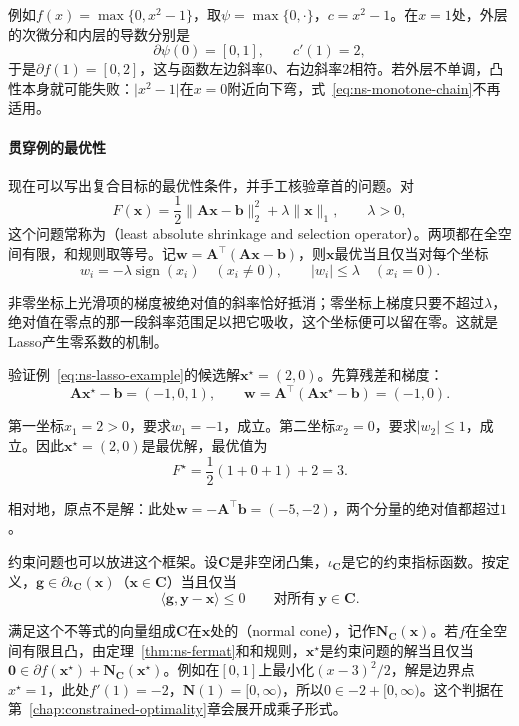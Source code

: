 例如$f(x)=\max\{0,x^2-1\}$，取$\psi=\max\{0,\cdot\}$，$c=x^2-1$。在$x=1$处，外层的次微分和内层的导数分别是
\[
 \partial\psi(0)=[0,1],\qquad c'(1)=2,
\]
于是$\partial f(1)=[0,2]$，这与函数左边斜率$0$、右边斜率$2$相符。若外层不单调，凸性本身就可能失败：$\lvert x^2-1\rvert$在$x=0$附近向下弯，式~\eqref{eq:ns-monotone-chain}不再适用。

\paragraph{贯穿例的最优性}
现在可以写出复合目标的最优性条件，并手工核验章首的问题。对
\begin{equation}
 F(\bm{x})=\frac12\lVert\bm{A}\bm{x}-\bm{b}\rVert_2^2+\lambda\lVert\bm{x}\rVert_1,\qquad\lambda>0,
 \label{eq:ns-lasso}
\end{equation}
这个问题常称为（least absolute shrinkage and selection operator）。两项都在全空间有限，和规则取等号。记$\bm{w}=\bm{A}^\top(\bm{A}\bm{x}-\bm{b})$，则$\bm{x}$最优当且仅当对每个坐标
\begin{equation}
 w_i=-\lambda\operatorname{sign}(x_i)\quad(x_i\neq0),\qquad\lvert w_i\rvert\leq\lambda\quad(x_i=0).
 \label{eq:ns-lasso-optimality}
\end{equation}

非零坐标上光滑项的梯度被绝对值的斜率恰好抵消；零坐标上梯度只要不超过$\lambda$，绝对值在零点的那一段斜率范围足以把它吸收，这个坐标便可以留在零。这就是Lasso产生零系数的机制。

验证例~\eqref{eq:ns-lasso-example}的候选解$\bm{x}^\star=(2,0)$。先算残差和梯度：
\[
 \bm{A}\bm{x}^\star-\bm{b}=(-1,0,1),\qquad\bm{w}=\bm{A}^\top(\bm{A}\bm{x}^\star-\bm{b})=(-1,0).
\]

第一坐标$x_1=2>0$，要求$w_1=-1$，成立。第二坐标$x_2=0$，要求$\lvert w_2\rvert\leq1$，成立。因此$\bm{x}^\star=(2,0)$是最优解，最优值为
\[
 F^\star=\frac12(1+0+1)+2=3.
\]

相对地，原点不是解：此处$\bm{w}=-\bm{A}^\top\bm{b}=(-5,-2)$，两个分量的绝对值都超过$1$。

约束问题也可以放进这个框架。设$\bm{C}$是非空闭凸集，$\iota_{\bm{C}}$是它的约束指标函数。按定义，$\bm{g}\in\partial\iota_{\bm{C}}(\bm{x})$（$\bm{x}\in\bm{C}$）当且仅当
\begin{equation}
 \langle\bm{g},\bm{y}-\bm{x}\rangle\leq0\qquad\text{对所有}\ \bm{y}\in\bm{C}.
 \label{eq:ns-normal-cone}
\end{equation}

满足这个不等式的向量组成$\bm{C}$在$\bm{x}$处的（normal cone），记作$\bm{N}_{\bm{C}}(\bm{x})$。若$f$在全空间有限且凸，由定理~\ref{thm:ns-fermat}和和规则，$\bm{x}^\star$是约束问题的解当且仅当$\bm{0}\in\partial f(\bm{x}^\star)+\bm{N}_{\bm{C}}(\bm{x}^\star)$。例如在$[0,1]$上最小化$(x-3)^2/2$，解是边界点$x^\star=1$，此处$f'(1)=-2$，$\bm{N}(1)=[0,\infty)$，所以$0\in-2+[0,\infty)$。这个判据在第~\ref{chap:constrained-optimality}章会展开成乘子形式。

